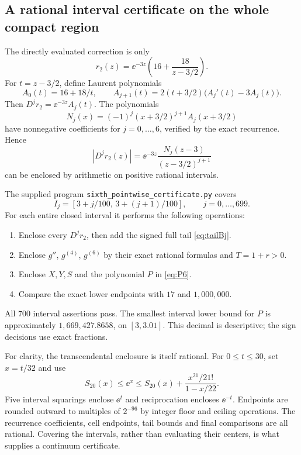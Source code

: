 \subsection{A rational interval certificate on the whole compact region}
The directly evaluated correction is only
\[
r_2(z)=\ee^{-3z}\left(16+\frac{18}{z-3/2}\right).
\]
For $t=z-3/2$, define Laurent polynomials
\[
A_0(t)=16+18/t,\qquad
A_{j+1}(t)=2(t+3/2)\bigl(A_j'(t)-3A_j(t)\bigr).
\]
Then $D^jr_2=\ee^{-3z}A_j(t)$. The polynomials
\[
N_j(x)=(-1)^j(x+3/2)^{j+1}A_j(x+3/2)
\]
have nonnegative coefficients for $j=0,\ldots,6$, verified by the exact recurrence. Hence
\[
|D^jr_2(z)|=\ee^{-3z}\frac{N_j(z-3)}{(z-3/2)^{j+1}}
\]
can be enclosed by arithmetic on positive rational intervals.

The supplied program \texttt{sixth\_pointwise\_certificate.py} covers
\begin{equation}\label{eq:cells}
I_j=[3+j/100,\,3+(j+1)/100],\qquad j=0,\ldots,699.
\end{equation}
For each entire closed interval it performs the following operations:
\begin{enumerate}
\item Enclose every $D^jr_2$, then add the signed full tail \eqref{eq:tailBj}.
\item Enclose $g''$, $g^{(4)}$, $g^{(6)}$ by their exact rational formulas and $T=1+r>0$.
\item Enclose $X,Y,S$ and the polynomial $P$ in \eqref{eq:P6}.
\item Compare the exact lower endpoints with $17$ and $1{,}000{,}000$.
\end{enumerate}
All 700 interval assertions pass. The smallest interval lower bound for $P$ is approximately $1{,}669{,}427.8658$, on $[3,3.01]$. This decimal is descriptive; the sign decisions use exact fractions.

For clarity, the transcendental enclosure is itself rational. For $0\le t\le30$, set $x=t/32$ and use
\[
S_{20}(x)\le\ee^x\le S_{20}(x)+\frac{x^{21}/21!}{1-x/22}.
\]
Five interval squarings enclose $\ee^t$ and reciprocation encloses $\ee^{-t}$. Endpoints are rounded outward to multiples of $2^{-96}$ by integer floor and ceiling operations. The recurrence coefficients, cell endpoints, tail bounds and final comparisons are all rational. Covering the intervals, rather than evaluating their centers, is what supplies a continuum certificate.


